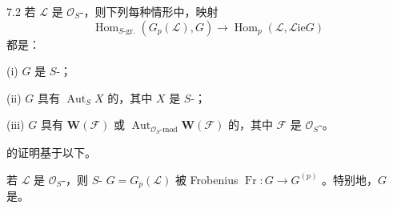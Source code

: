 \begin{SGAresult}{}{7.2}
若 $\mathcal L$ 是 $\mathcal O_S$-，则下列每种情形中，映射
\[
 \operatorname{Hom}_{S\text{-gr.}}(G_p(\mathcal L),G)
 \longrightarrow\operatorname{Hom}_p(\mathcal L,\mathscr{L}\mathrm{ie}G)
\]
都是：

(i) $G$ 是 $S$-；

(ii) $G$ 具有 $\operatorname{Aut}_SX$ 的，其中 $X$ 是 $S$-；

(iii) $G$ 具有 $\mathbf W(\mathcal F)$ 或 $\operatorname{Aut}_{\mathcal O_S\text{-mod}}\mathbf W(\mathcal F)$ 的，其中 $\mathcal F$ 是 $\mathcal O_S$-。
\end{SGAresult}
的证明基于以下。
\begin{SGAresult}{}{}
若 $\mathcal L$ 是 $\mathcal O_S$-，则 $S$- $G=G_p(\mathcal L)$ 被 Frobenius  $\operatorname{Fr}:G\to G^{(p)}$ 。特别地，$G$ 是。
\end{SGAresult}
